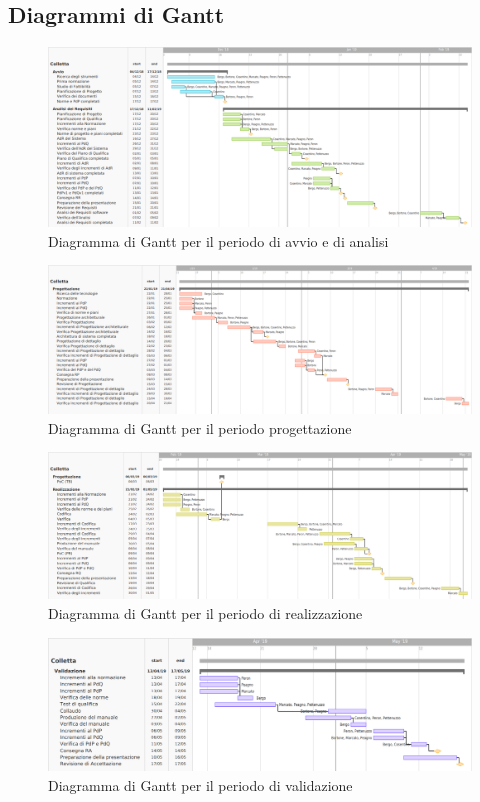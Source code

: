 \subsection{Diagrammi di Gantt}
\begin{figure}[hbt!]
	\centering
	\includegraphics[scale=0.45,angle=90]{images/ganttan.png}
	\caption{Diagramma di Gantt per il periodo di avvio e di analisi}
\end{figure}

\newpage
\begin{figure}[hbt!]
	\centering
	\includegraphics[scale=0.45,angle=90]{images/ganttprog.png}
	\caption{Diagramma di Gantt per il periodo progettazione}
\end{figure}

\newpage
\begin{figure}[hbt!]
	\centering
	\includegraphics[scale=0.45, angle=90]{images/ganttreal.png}
	\caption{Diagramma di Gantt per il periodo di realizzazione}
\end{figure}

\newpage
\begin{figure}[hbt!]
	\centering
	\includegraphics[scale=0.45, angle=90]{images/ganttval.png}
	\caption{Diagramma di Gantt per il periodo di validazione}
\end{figure}